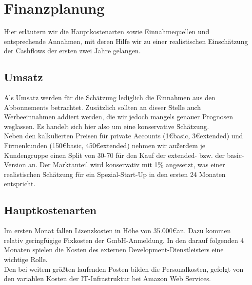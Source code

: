 
\section{Finanzplanung}
Hier erläutern wir die Hauptkostenarten sowie Einnahmequellen und entsprechende Annahmen, mit deren Hilfe wir zu einer realistischen Einschätzung der Cashflows der ersten zwei Jahre gelangen.
\subsection{Umsatz}
Als Umsatz werden für die Schätzung lediglich die Einnahmen aus den Abbonnements betrachtet. Zusätzlich sollten an dieser Stelle auch Werbeeinnahmen addiert werden, die wir jedoch mangels genauer Prognosen weglassen. Es handelt sich hier also um eine konservative Schätzung.\\
Neben den kalkulierten Preisen für private Accounts (1\euro basic, 3\euro extended) und Firmenkunden (150\euro basic, 450\euro extended) nehmen wir außerdem je Kundengruppe einen Split von 30-70 für den Kauf der extended- bzw. der basic-Version an. Der Marktanteil wird konservativ mit 1\% angesetzt, was einer realistischen Schätzung für ein Spezial-Start-Up in den ersten 24 Monaten entspricht.
\subsection{Hauptkostenarten}
Im ersten Monat fallen Lizenzkosten in Höhe von 35.000\euro an. Dazu kommen relativ geringfügige Fixkosten der GmbH-Anmeldung. In den darauf folgenden 4 Monaten spielen die Kosten des externen Development-Dienstleisters eine wichtige Rolle. \\
Den bei weitem größten laufenden Posten bilden die Personalkosten, gefolgt von den variablen Kosten der IT-Infrastruktur bei Amazon Web Services. 

